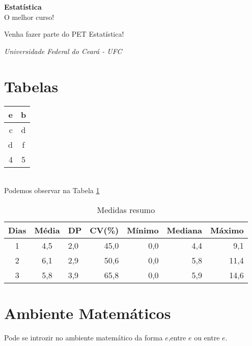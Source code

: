 \documentclass[12pt]{article} %
\begin{document}
\begin{center}
   \textbf{\huge{Estatística}}\\
   \LARGE{O melhor curso!}\\
\end{center}

\begin{flushright}
    Venha fazer parte do PET Estatística! 
\end{flushright}

\begin{flushleft}
    \textit{Universidade Federal do Ceará - UFC}
\end{flushleft}

\section{Tabelas}
\begin{tabular}{r|c} %
   
   \hline
   
   e  & b\\
   \hline
   c  & d\\
   \hline
   d & f \\
   \hline
   4 & 5\\
   
   \hline
   
\end{tabular}\\
Podemos observar na Tabela \ref{medidasresumo} %

\begin{table}[H]
\caption{Medidas resumo}%
\vspace{0.3cm}
\centering
\begin{tabular}{cclrrrr} %
  \hline %
 Dias & Média & DP & CV(\%) & Mínimo & Mediana & Máximo \\ 
  \hline
  

  1 & 4,5 & 2,0 & 45,0 & 0,0 & 4,4 &  9,1  \\ 
  2 & 6,1 & 2,9 & 50,6 & 0,0 & 5,8 & 11,4 \\ 
  3 & 5,8 & 3,9 & 65,8 & 0,0 & 5,9 & 14,6 \\ 
   \hline
\end{tabular}
\label{medidasresumo} %
\end{table}
\section{Ambiente Matemáticos}
Pode se introzir no ambiente matemático da forma \( e \),entre $ e $ ou entre \begin{math} e \end{math}.\\
\end{document}
